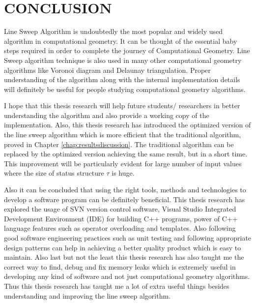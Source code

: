 %

\chapter{CONCLUSION}
\label{chap:conclusion}

Line Sweep Algorithm is undoubtedly the most popular and widely used algorithm in computational geometry. It can be thought of the essential baby steps required in order to complete the journey of Computational Geometry. Line Sweep algorithm technique is also used in many other computational geometry algorithms like Voronoi diagram and Delaunay triangulation. Proper understanding of the algorithm along with the internal implementation details will definitely be useful for people studying computational geometry algorithms.

I hope that this thesis research will help future students/ researchers in better understanding the algorithm and also provide a working copy of the implementation. Also, this thesis research has introduced the optimized version of the line sweep algorithm which is more efficient that the  traditional algorithm, proved in Chapter \ref{chap:resultsdiscussion}. The traditional algorithm can be replaced by the optimized version achieving the same result, but in a short time. This improvement will be particularly evident for large number of input values where the size of status structure $\tau$ is huge.

Also it can be concluded that using the right tools, methods and technologies to develop a software program can be definitely beneficial. This thesis research has explored the usage of SVN version control software, Visual Studio Integrated Development Environment (IDE) for building C++ programs, power of C++ language features such as operator overloading and templates. Also following good software engineering practices such as unit testing and following appropriate design patterns can help in achieving a better quality product which is easy to maintain. Also last but not the least this thesis research has also taught me the correct way to find, debug and fix memory leaks which is extremely useful in developing any kind of software and not just computational geometry algorithms. Thus this thesis research has taught me a lot of extra useful things besides understanding and improving the line sweep algorithm.
